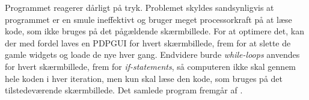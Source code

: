 Programmet reagerer dårligt på tryk. Problemet skyldes sandsynligvis at programmet er en smule ineffektivt og bruger meget processorkraft på at læse kode, som ikke bruges på det pågældende skærmbillede. For at optimere det, kan der med fordel laves en PDPGUI for hvert skærmbillede, frem for at slette de gamle widgets og loade de nye hver gang. Endvidere burde \textit{while-loops} anvendes for hvert skærmbillede, frem for \textit{if-statements}, så computeren ikke skal gennem hele koden i hver iteration, men kun skal læse den kode, som bruges på det tilstedeværende skærmbillede.\blankline
%
Det samlede program fremgår af .
